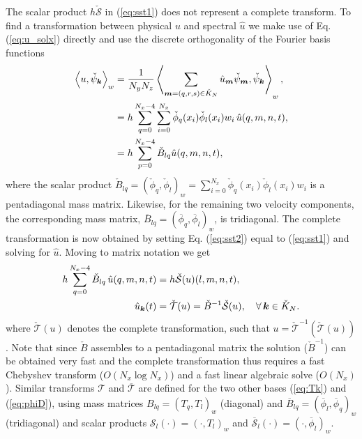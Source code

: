 \documentclass[11pt, oneside]{article}
\newcommand{\N}[1]{\check{#1}}
\newcommand{\D}[1]{\overline{#1}}
\begin{document}
The scalar product  $h\N{\mathcal{S}}$ in (\ref{eq:sst1}) does not represent a 
complete transform. To find a transformation between physical $u$ and spectral 
$\hat{u}$ we make use of Eq. (\ref{eq:u_solx}) directly and use the discrete 
orthogonality of the Fourier basis functions
\begin{align}
\left<u, \N{\psi}_{\bm{k}}\right>_w &= \frac{1}{N_yN_z}\left< 
\sum_{\bm{m}=(q,r,s) \in \N{K}_N} \hat{u}_{\bm{m}} \N{\psi}_{\bm{m}}, 
\N{\psi}_{\bm{k}} \right>_w, \notag \\
           &= h \sum_{q=0}^{N_x-4} \sum_{i=0}^{N_x} \N{\phi}_{q}(x_i) 
           \N{\phi}_{l}(x_i) w_i \, \hat{u}(q, {m}, {n}, t), \notag \\
           &= h \sum_{p=0}^{N_x-4} \N{B}_{lq} \hat{u}(q, {m}, {n}, t), 
           \label{eq:sst2}
\end{align}
where the scalar product $\N{B}_{lq} = (\N{\phi}_q, \N{\phi}_l)_w = 
\sum_{i=0}^{N_x} \N{\phi}_{q}(x_i) \N{\phi}_{l}(x_i) w_i$ is a 
pentadiagonal mass matrix. Likewise, for the remaining two velocity components, 
the corresponding mass matrix, $\D{B}_{lq} = (\D{\phi}_q, \D{\phi}_l)_w$, is 
tridiagonal. The complete transformation is now obtained by setting Eq. 
(\ref{eq:sst2}) equal to (\ref{eq:sst1}) and solving for $\hat{u}$. Moving to 
matrix notation we get
\begin{align}
h\sum_{q=0}^{N_x-4} \N{B}_{lq}\, \hat{u}(q, {m}, {n}, t) &= 
h\N{\mathcal{S}}(u)(l, m, n, t), \notag \\
 \hat{u}_{\bm{k}}(t) &= \N{\mathcal{T}}(u) =  \N{B}^{-1}\N{\mathcal{S}}(u), 
 \quad \forall \, \bm{k} \in \N{K}_N.
\end{align}
where $\N{\mathcal{T}}(u)$ denotes the complete transformation, such that $u = 
\N{\mathcal{T}}^{-1}(\N{\mathcal{T}}(u))$. Note that since $\N{B}$ assembles to 
a pentadiagonal matrix the solution ($\N{B}^{-1}$) can be obtained very fast 
and 
the complete 
transformation thus requires a fast Chebyshev transform ($O(N_x \log N_x)$) and 
a fast linear algebraic solve ($O(N_x)$). Similar transforms $\mathcal{T}$ 
and $\D{\mathcal{T}}$ are defined for the two other bases (\ref{eq:Tk}) and 
(\ref{eq:phiD}), using mass matrices $B_{lq}=(T_q, T_l)_w$ (diagonal) and 
$\D{B}_{lq}=(\D{\phi}_l, \D{\phi}_q)_w$ (tridiagonal) and scalar products 
$\mathcal{S}_l(\cdot) = (\cdot, T_l)_w$ and $\D{\mathcal{S}}_l(\cdot) = (\cdot, 
\D{\phi}_l)_w$.
\end{document}
